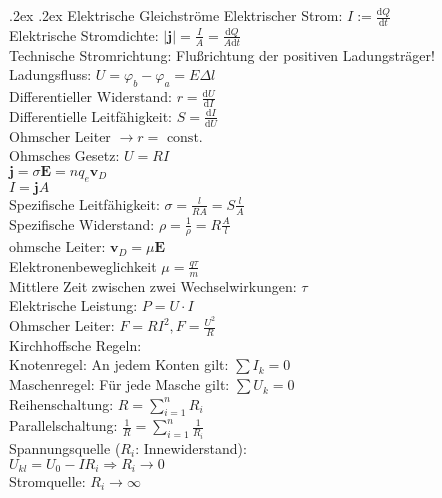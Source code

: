 \documentclass[9pt, landscape,a4paper]{extarticle}
\makeatletter
\renewcommand{\section}{\@startsection{section}{1}{0mm}%
                                {.2ex}%
                                {.2ex}%
                                {\sffamily\small\bfseries}}
\renewcommand\v[1]{\vec{#1}}
\renewcommand\d{\mathrm{d}}
\renewcommand{\vec}[1]{\mathbf{#1}}
\newcommand*\abs[1]{\lvert#1\rvert}
\newcommand{\dd}[2]{\frac{\d #1}{\d #2}}
\newcommand{\const}{\ensuremath{\text{ const.}}}%
\makeatother
\begin{document}
\begin{multicols*}{4}
\section{Elektrische Gleichströme}
Elektrischer Strom: $I := \dd{Q}{t}$ \\
Elektrische Stromdichte: $\abs{\v j} = \frac{I}{A} = \frac{\d Q}{A \d t}$ \\
Technische Stromrichtung: Flußrichtung der positiven Ladungsträger! \\
Ladungsfluss: $U = φ_b - φ_a = E Δl$ \\
Differentieller Widerstand: $r = \dd{U}{I}$ \\
Differentielle Leitfähigkeit: $S = \dd{I}{U}$ \\
Ohmscher Leiter $\to r = \const$ \\
Ohmsches Gesetz: $U = R I$ \\
$\v j = σ \v E = n q_e \v v_D$ \\
$I = \v j A$ \\
Spezifische Leitfähigkeit: $σ = \frac{l}{RA} = S \frac{l}{A}$ \\
Spezifische Widerstand: $ρ = \frac{1}{ρ} = R \frac{A}{l}$ \\
ohmsche Leiter: $\v v_D = μ \v E$ \\
Elektronenbeweglichkeit $μ = \frac{q τ}{m}$ \\
Mittlere Zeit zwischen zwei Wechselwirkungen: $τ$ \\
Elektrische Leistung: $P = U · I$ \\
Ohmscher Leiter: $F = R I^2, F = \frac{U^2}{R}$ \\
Kirchhoffsche Regeln: \\
Knotenregel: An jedem Konten gilt: $\sum I_k = 0$ \\
Maschenregel: Für jede Masche gilt: $\sum U_k = 0$ \\
Reihenschaltung: $R = \sum_{i = 1}^n R_i$ \\
Parallelschaltung: $\frac{1}{R} = \sum_{i = 1}^n \frac{1}{R_i}$ \\
Spannungsquelle ($R_i$: Innewiderstand): \\
$U_{kl} = U_0 - I R_i ⇒ R_i \to 0$ \\
Stromquelle: $R_i \to ∞$

\end{multicols*}
\end{document}
